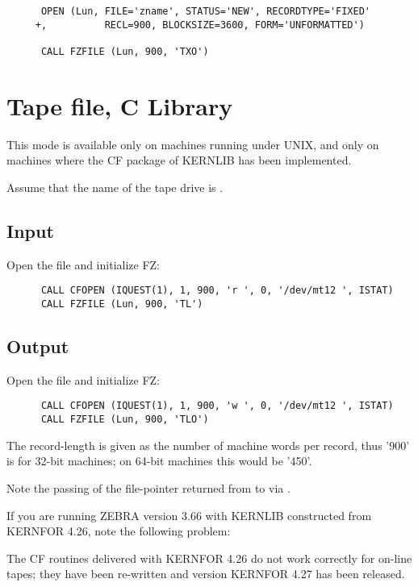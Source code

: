 \begin{verbatim}
      OPEN (Lun, FILE='zname', STATUS='NEW', RECORDTYPE='FIXED'
     +,          RECL=900, BLOCKSIZE=3600, FORM='UNFORMATTED')

      CALL FZFILE (Lun, 900, 'TXO')
\end{verbatim}

\section{Tape file, C Library}

This mode is available only on machines running under UNIX,
and only on machines where the CF package of KERNLIB has
been implemented.

Assume that the name of the tape drive is .

\subsection*{Input}

Open the file and initialize FZ:

\begin{verbatim}
      CALL CFOPEN (IQUEST(1), 1, 900, 'r ', 0, '/dev/mt12 ', ISTAT)
      CALL FZFILE (Lun, 900, 'TL')
\end{verbatim}

\subsection*{Output}

Open the file and initialize FZ:

\begin{verbatim}
      CALL CFOPEN (IQUEST(1), 1, 900, 'w ', 0, '/dev/mt12 ', ISTAT)
      CALL FZFILE (Lun, 900, 'TLO')
\end{verbatim}

The record-length is given as the number of machine words per
record, thus '900' is for 32-bit machines;
on 64-bit machines this would be '450'.

Note the passing of the file-pointer returned from 
to  via .

If you are running ZEBRA version 3.66 with KERNLIB constructed
from KERNFOR 4.26, note the following problem:

The CF routines delivered with KERNFOR 4.26 do not work
correctly for on-line tapes; they have been re-written
and version KERNFOR 4.27 has been released.

